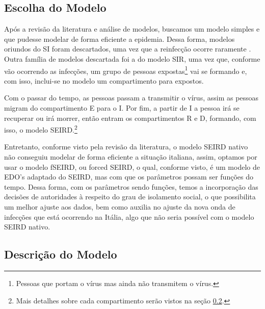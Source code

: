 \documentclass{article}
\begin{document}
\subsection{Escolha do Modelo}

Após a revisão da literatura e análise de modelos, buscamos um modelo simples e que pudesse modelar de forma eficiente a epidemia. Dessa forma, modelos oriundos do SI foram descartados, uma vez que a reinfecção ocorre raramente \cite{again}. Outra família de modelos descartada foi a do modelo SIR, uma vez que, conforme vão ocorrendo as infecções, um grupo de pessoas expostas\footnote{Pessoas que portam o vírus mas ainda não transmitem o vírus.} vai se formando e, com isso, inclui-se no modelo um compartimento para expostos.

Com o passar do tempo, as pessoas passam a transmitir o vírus, assim as pessoas migram do compartimento E para o I. Por fim, a partir de I a pessoa irá se recuperar ou irá morrer, então entram os compartimentos R e D, formando, com isso, o modelo SEIRD.\footnote{Mais detalhes sobre cada compartimento serão vistos na seção \ref{descrição_do_modelo}.}

Entretanto, conforme visto pela revisão da literatura, o modelo SEIRD nativo não conseguiu modelar de forma eficiente a situação italiana, assim, optamos por usar o modelo fSEIRD, ou forced SEIRD, o qual, conforme visto, é um modelo de EDO's adaptado do SEIRD, mas com que os parâmetros possam ser funções do tempo. Dessa forma, com os parâmetros sendo funções, temos a incorporação das decisões de autoridades à respeito do grau de isolamento social, o que possibilita um melhor ajuste aos dados, bem como auxilia no ajuste da nova onda de infecções que está ocorrendo na Itália, algo que não seria possível com o modelo SEIRD nativo.

\subsection{Descrição do Modelo} \label{descrição_do_modelo}
\end{document}
